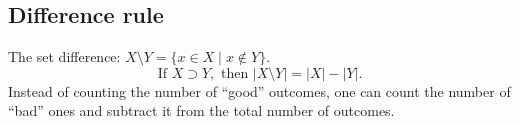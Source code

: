 

\setcounter{section}{1}
\setcounter{subsection}{3}
\setcounter{dfn}{2}

\subsection{Difference rule}
The set difference: $X \setminus Y = \{x \in X \mid x \notin Y\}$.
\[
\text{If }X \supset Y, \text{ then } |X \setminus Y| = |X| - |Y|.
\]
Instead of counting the number of ``good'' outcomes,
one can count the number of ``bad'' ones and subtract it from the total number of outcomes.


